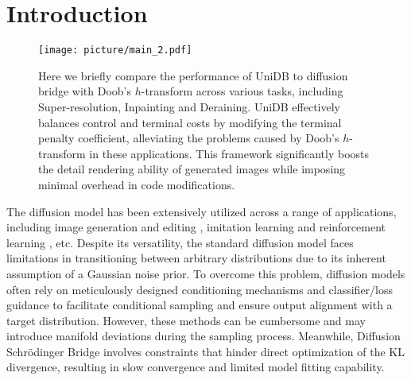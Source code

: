 \section{Introduction}
\begin{figure*}[t] %
    \centering
    \texttt{[image: picture/main\_2.pdf]}
    \vspace{-4mm}
    \caption{Here we briefly compare the performance of UniDB to diffusion bridge with Doob's $h$-transform 
    \cite{yue2024imagerestorationgeneralizedornsteinuhlenbeck} across various tasks, including Super-resolution, Inpainting and Deraining. UniDB effectively balances control and terminal costs by modifying the terminal penalty coefficient, alleviating the problems caused by Doob's $h$-transform  in these applications. This framework significantly boosts the detail rendering ability of generated images while imposing minimal overhead in code modifications.}
    \label{fig:widefig}
    \vspace{-3mm}
\end{figure*}


The diffusion model has been extensively utilized across a range of applications, including image generation and editing \cite{ho2020denoisingdiffusionprobabilisticmodels, DDRM, song2021scorebasedgenerativemodelingstochastic, DiffIR, li2023diffusionmodelsimagerestoration}, imitation learning \cite{afforddp, dp, 3ddp} and reinforcement learning \cite{yang2023policyrepresentationdiffusionprobability, QVPO}, etc. Despite its versatility, the standard diffusion model faces limitations in transitioning between arbitrary distributions due to its inherent assumption of a Gaussian noise prior. To overcome this problem, diffusion models \cite{dhariwal2021diffusionmodelsbeatgans, ho2022classifier,  murata2023gibbsddrmpartiallycollapsedgibbs, CCDM, chung2024diffusionposteriorsamplinggeneral, tang2024unified} often rely on meticulously designed conditioning mechanisms and classifier/loss guidance to facilitate conditional sampling and ensure output alignment with a target distribution. However, these methods can be cumbersome and may introduce manifold deviations during the sampling process. Meanwhile, Diffusion Schrödinger Bridge \cite{shi2023diffusionschrodingerbridgematching, debortoli2023diffusionschrodingerbridgeapplications, somnath2024aligneddiffusionschrodingerbridges} involves constraints that hinder direct optimization of the KL divergence, resulting in slow convergence and limited model fitting capability.

